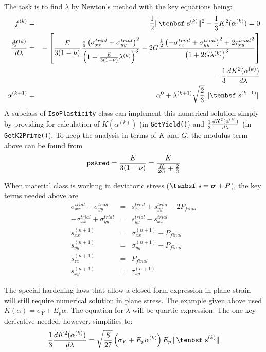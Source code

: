\documentclass[11pt]{book}
\renewcommand{\vec}[1]{\boldsymbol{#1}}
\def\dev{\hbox{\tenbsf s}}
\def\code#1{{\small\tt #1}}
\def\s#1{\sigma_{#1}}
\begin{document}
The task is to find $\lambda$ by Newton's method with the key equations being:
\begin{eqnarray}
        f^{(k)} & = & {1\over 2}\|\dev^{(k)}\|^2 -  {1\over 3} K^2(\alpha^{(k)}) = 0 \\
        {df^{(k)}\over d\lambda} & = & -\left[{ E\over 3(1-\nu)}{{1\over 6}\left( \s{xx}^{trial} +  \s{yy}^{trial} \right)^2 \over
                                                     \left( 1 + { E\over 3(1-\nu)}\lambda^{(k)}\right)^3}
             + 2G{{1\over 2}\left( -\s{xx}^{trial} +  \s{yy}^{trial} \right)^2 + 2{\tau_{xy}^{trial}}^2 \over \left(1 + 2 G\lambda^{(k)}\right)^3}\right]  
 \nonumber \\
 &&\qquad\mbox{}
                                       - {1\over 3}{dK^2(\alpha^{(k)})\over d\lambda}  \\
        \alpha^{(k+1)} & = & \alpha^{0} +  \lambda^{(k+1)} \sqrt{2\over3}\thinspace \|\dev^{(k+1)}\|
\end{eqnarray}
A subclass of \code{IsoPlasticity} class can implement this numerical solution simply by providing for calculation of $K(\alpha^{(k)})$ (in \code{GetYield()}) and ${1\over3}{dK^2(\alpha^{(k)})\over d\lambda}$ (in \code{GetK2Prime()}). To keep the analysis in terms of $K$ and $G$, the modulus term above can be found from
\begin{equation}
       \code{psKred} = { E\over 3(1-\nu)} = {K \over {K\over 2G} + {2\over 3}} 
\end{equation}

When material class is working in deviatoric stress ($\dev = \vec\sigma+P$), the key terms needed above are
\begin{eqnarray}
       \s{xx}^{trial} +  \s{yy}^{trial} & = & s_{xx}^{trial} + s_{yy}^{trial} - 2P_{final} \\
       -\s{xx}^{trial} +  \s{yy}^{trial}  & = & s_{yy}^{trial} - s_{xx}^{trial} \\
       s_{xx}^{(n+1)} & = & \s{xx}^{(n+1)} + P_{final} \\
       s_{yy}^{(n+1)} & = & \s{yy}^{(n+1)} + P_{final} \\
       s_{zz}^{(n+1)} & = & P_{final} \\
       s_{xy}^{(n+1)} & = &  \tau_{xy}^{(n+1)} 
\end{eqnarray}

The special hardening laws that allow a closed-form expression in plane strain will still require numerical solution in plane stress. The example given above used $K(\alpha)=\sigma_Y + E_p\alpha$. The equation for $\lambda$ will be quartic expression. The one key derivative needed, however, simplifies to:
\begin{equation}
      {1\over3}{dK^2(\alpha^{(k)})\over d\lambda} = \sqrt{8\over27}
           \left(\sigma_Y + E_p\alpha^{(k)}\right)E_p\thinspace \|\dev^{(k)}\|
\end{equation}
\end{document}
